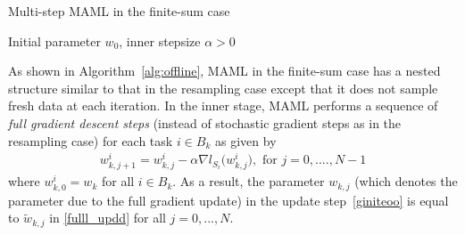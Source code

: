 \documentclass{osudissert96}
\begin{document}
\begin{algorithm}[t]
	\caption{Multi-step MAML in the finite-sum case} 
	\label{alg:offline}
	\begin{algorithmic}[1]
		  Initial parameter $w_0$, inner stepsize $\alpha>0$	
		\ENDFOR
		\ENDFOR
		\STATE{
			Update $w_{k+1}= w_k -\frac{\beta_k}{|B_k|} \sum_{i\in B_k}\widehat G_i(w_k)$
			}
		\ENDFOR
	\end{algorithmic}
\end{algorithm}


As shown in Algorithm~\ref{alg:offline}, MAML in the finite-sum case has a nested structure similar to that in the resampling case except that it does not sample fresh data at each iteration. 
In the inner stage, MAML performs a sequence of {\em full gradient descent steps} (instead of stochastic gradient steps as in the resampling case) for each task $i \in B_k$ as given by 
\begin{align}\label{giniteoo}
w^i_{k, j+1} = w^i_{k, j} - \alpha \nabla l_{S_i}\big(w^i_{k,j}\big), \text{ for } j=0,....,N-1
\end{align}  
where $w_{k,0}^i = w_k$ for all $i\in B_k$. As a result, the parameter $w_{k,j}$ (which denotes the parameter due to the full gradient update) in the update step~\cref{giniteoo} is equal to $\widetilde w_{k,j}$ in \cref{fulll_updd} for all $j=0,...,N$. 

\end{document}
